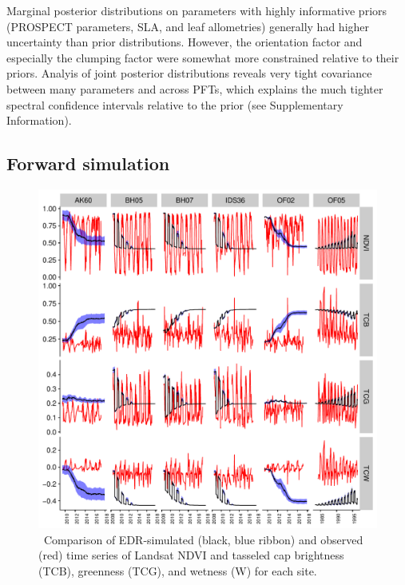 Marginal posterior distributions on parameters with highly informative priors (PROSPECT parameters, SLA, and leaf allometries) generally had higher uncertainty than prior distributions.
% 
% 
However, the orientation factor and especially the clumping factor were somewhat more constrained relative to their priors.
Analyis of joint posterior distributions reveals very tight covariance between many parameters and across PFTs, which explains the much tighter spectral confidence intervals relative to the prior (see Supplementary Information).

\subsection{Forward simulation}

\begin{figure}
  \centering
  \includegraphics[width=\textwidth]{figures/landsat_ts.pdf}
  \caption{\
    Comparison of EDR-simulated (black, blue ribbon) and observed (red) time series of Landsat NDVI and tasseled cap brightness (TCB), greenness (TCG), and wetness (W) for each site.
  }
\end{figure}
